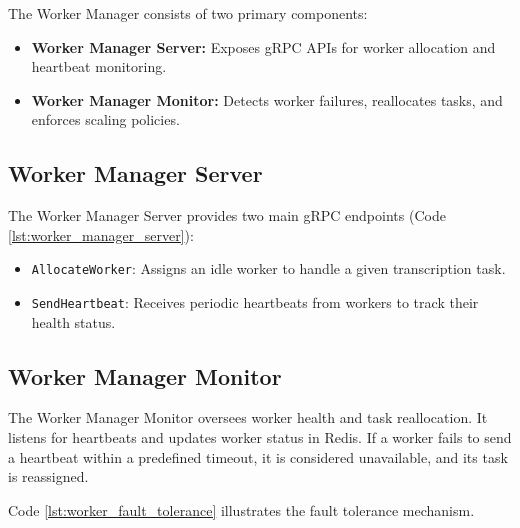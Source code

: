 The Worker Manager consists of two primary components:
\begin{itemize}
    \item \textbf{Worker Manager Server:} Exposes gRPC APIs for worker allocation and heartbeat monitoring.
    \item \textbf{Worker Manager Monitor:} Detects worker failures, reallocates tasks, and enforces scaling policies.
\end{itemize}

\subsection{Worker Manager Server}
The Worker Manager Server provides two main gRPC endpoints (Code \ref{lst:worker_manager_server}):
\begin{itemize}
    \item \texttt{AllocateWorker}: Assigns an idle worker to handle a given transcription task.
    \item \texttt{SendHeartbeat}: Receives periodic heartbeats from workers to track their health status.
\end{itemize}


\subsection{Worker Manager Monitor} \label{subsection:worker_manager_monitor}
The Worker Manager Monitor oversees worker health and task reallocation. It listens for heartbeats and updates worker status in Redis. If a worker fails to send a heartbeat within a predefined timeout, it is considered unavailable, and its task is reassigned. 

Code \ref{lst:worker_fault_tolerance} illustrates the fault tolerance mechanism.

